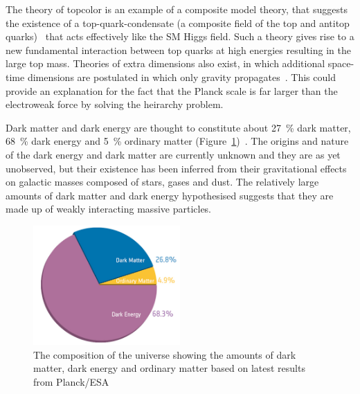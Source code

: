 The theory of topcolor is an example of a composite model theory, that suggests the existence of a
top-quark-condensate (a composite field of the top and antitop
quarks)~\cite{1990PhRvD..41.1647B,1991PhLB..266..419H} that acts effectively like the SM Higgs field. Such a
theory gives rise to a new fundamental interaction between top quarks at high energies resulting in the large
top mass. Theories of extra dimensions also exist, in which additional space-time dimensions are postulated in
which only gravity propagates~\cite{ArkaniHamed:1998rs}.
This could provide an explanation for the fact that the Planck scale is far larger than the electroweak force
by solving the heirarchy problem.

Dark matter and dark energy are thought to constitute about 27~\% dark matter, 68~\% dark energy and 5~\%
ordinary matter (Figure~\ref{fig:universe_composition})~\cite{Ade:2013sjv}. The origins and nature of the
dark energy and dark matter are currently unknown and they are as yet unobserved, but their existence has been
inferred from their gravitational effects on galactic masses composed of stars, gases and dust. The relatively
large amounts of dark matter and dark energy hypothesised suggests that they are made up of weakly interacting
massive particles.

\begin{figure}[hbtp]
   \centering
     \includegraphics[width=0.5\textwidth]{Chapters/03_Theory/Images/planck_cosmic_pie}\hfill
     \caption[The composition of the universe showing the amounts of dark matter, dark energy and ordinary
     matter.]{The composition of the universe showing the amounts of dark matter, dark energy and ordinary
     matter based on latest results from Planck/ESA~\cite{Ade:2013sjv}}
     \label{fig:universe_composition}
\end{figure}
